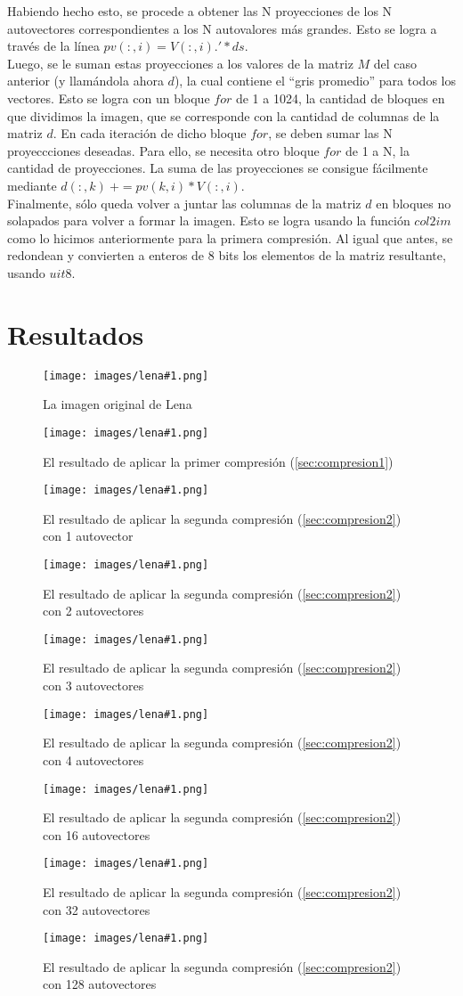 \documentclass[twocolumn,a4paper,10pt]{article}
\begin{document}
Habiendo hecho esto, se procede a obtener las N proyecciones de los N autovectores correspondientes a los N autovalores más grandes. Esto se logra a través de la 
l\'inea $pv(:,i) = V(:,i).' * ds$. \\

Luego, se le suman estas proyecciones a los valores de la matriz $M$ del caso anterior (y llam\'andola ahora $d$), la cual contiene el ``gris promedio'' para todos 
los vectores. Esto se logra con un bloque $for$ de 1 a 1024, la cantidad de bloques en que dividimos la imagen, que se corresponde con la cantidad de columnas 
de la matriz $d$. En cada iteración de dicho bloque $for$, se deben sumar las N proyeccciones deseadas. Para ello, se necesita otro bloque $for$ de 1 a N, la cantidad 
de proyecciones. La suma de las proyecciones se consigue f\'acilmente mediante $d(:,k)\: += pv(k,i) * V(:,i)$. \\

Finalmente, s\'olo queda volver a juntar las columnas de la matriz $d$ en bloques no solapados para volver a formar la imagen. Esto se logra usando la funci\'on 
$col2im$ como lo hicimos anteriormente para la primera compresi\'on. Al igual que antes, se redondean y convierten a enteros de 8 bits los elementos de la matriz
resultante, usando $uit8$.\\

\section{Resultados}

\newcommand{\lena}[2]{
    \begin{figure}[H]
        \label{lena#1}
        \texttt{[image: images/lena\#1.png]}
        \caption{#2}
    \end{figure}
}

\lena{512}{La imagen original de Lena}

\lena{-bruta}{El resultado de aplicar la primer compresi\'on (\ref{sec:compresion1})}

\lena{-eig-1}{El resultado de aplicar la segunda compresi\'on (\ref{sec:compresion2}) con 1 autovector}
\lena{-eig-2}{El resultado de aplicar la segunda compresi\'on (\ref{sec:compresion2}) con 2 autovectores}
\lena{-eig-3}{El resultado de aplicar la segunda compresi\'on (\ref{sec:compresion2}) con 3 autovectores}
\lena{-eig-4}{El resultado de aplicar la segunda compresi\'on (\ref{sec:compresion2}) con 4 autovectores}
\lena{-eig-16}{El resultado de aplicar la segunda compresi\'on (\ref{sec:compresion2}) con 16 autovectores}
\lena{-eig-32}{El resultado de aplicar la segunda compresi\'on (\ref{sec:compresion2}) con 32 autovectores}
\lena{-eig-128}{El resultado de aplicar la segunda compresi\'on (\ref{sec:compresion2}) con 128 autovectores}
\end{document}
